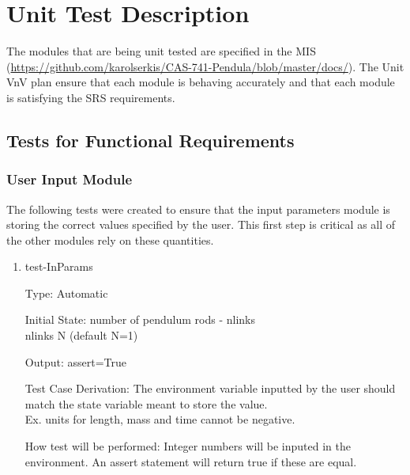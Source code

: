 \documentclass[12pt, titlepage]{article}
\begin{document}
\section{Unit Test Description}

The modules that are being unit tested are specified in the MIS 
(\url{https://github.com/karolserkis/CAS-741-Pendula/blob/master/docs/}). The Unit VnV plan 
ensure that each module is behaving accurately and that each module is 
satisfying the SRS requirements.\\ 
	
\subsection{Tests for Functional Requirements}

\subsubsection{User Input Module}

The following tests were created to ensure that the input parameters module is 
storing the correct values specified by the user. This first step is critical 
as all of the other modules rely on these quantities.

\begin{enumerate}				
\item{test-InParams\\}

Type: Automatic

Initial State: number of pendulum rods - nlinks\\
nlinks N (default N=1)

Output: assert=True

Test Case Derivation: The environment variable inputted by the user should 
match the state variable meant to store the value.\\
Ex. units for length, mass and time cannot be negative.

How test will be performed: Integer numbers will be inputed in the environment. 
An assert statement will return true if these are equal.

    
\end{enumerate}
\end{document}
